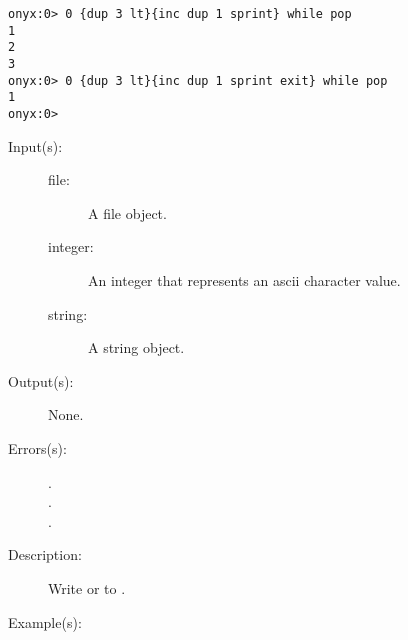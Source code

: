 \begin{description}
\begin{description}
\begin{verbatim}
onyx:0> 0 {dup 3 lt}{inc dup 1 sprint} while pop
1
2
3
onyx:0> 0 {dup 3 lt}{inc dup 1 sprint exit} while pop
1
onyx:0>
		\end{verbatim}
	\end{description}
\label{systemdict:write}
\item[{\onyxop{file integer/string}{write}{--}}: ]
	\begin{description}\item[]
	\item[Input(s): ]
		\begin{description}\item[]
		\item[file: ]
			A file object.
		\item[integer: ]
			An integer that represents an ascii character value.
		\item[string: ]
			A string object.
		\end{description}
	\item[Output(s): ] None.
	\item[Errors(s): ]
		\begin{description}\item[]
		\item[.]
		\item[.]
		\item[.]
		\end{description}
	\item[Description: ]
		Write  or  to .
	\item[Example(s): ]\begin{verbatim}


\end{verbatim}
\end{description}
\end{description}

